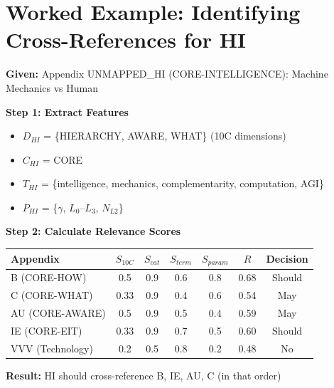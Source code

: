 \section{Worked Example: Identifying Cross-References for HI}
\label{sec:bo-worked-example}

\begin{tcolorbox}[colback=yellow!5!white, colframe=yellow!75!black,
    title=Worked Example: Cross-References for HI (CORE-INTELLIGENCE)]

\textbf{Given:} Appendix UNMAPPED_HI (CORE-INTELLIGENCE): Machine Mechanics vs Human

\textbf{Step 1: Extract Features}
\begin{itemize}[nosep]
\item $D_{HI}$ = \{HIERARCHY, AWARE, WHAT\} (10C dimensions)
\item $C_{HI}$ = CORE
\item $T_{HI}$ = \{intelligence, mechanics, complementarity, computation, AGI\}
\item $P_{HI}$ = \{$\gamma$, $L_0$--$L_3$, $N_{L2}$\}
\end{itemize}

\textbf{Step 2: Calculate Relevance Scores}

\begin{center}
\begin{tabular}{|l|cccc|c|c|}
\hline
Appendix & $S_{10C}$ & $S_{cat}$ & $S_{term}$ & $S_{param}$ & $R$ & Decision \\
\hline
B (CORE-HOW) & 0.5 & 0.9 & 0.6 & 0.8 & 0.68 & Should \\
C (CORE-WHAT) & 0.33 & 0.9 & 0.4 & 0.6 & 0.54 & May \\
AU (CORE-AWARE) & 0.5 & 0.9 & 0.5 & 0.4 & 0.59 & May \\
IE (CORE-EIT) & 0.33 & 0.9 & 0.7 & 0.5 & 0.60 & Should \\
VVV (Technology) & 0.2 & 0.5 & 0.8 & 0.2 & 0.48 & No \\
\hline
\end{tabular}
\end{center}

\textbf{Result:} HI should cross-reference B, IE, AU, C (in that order)

\end{tcolorbox}


